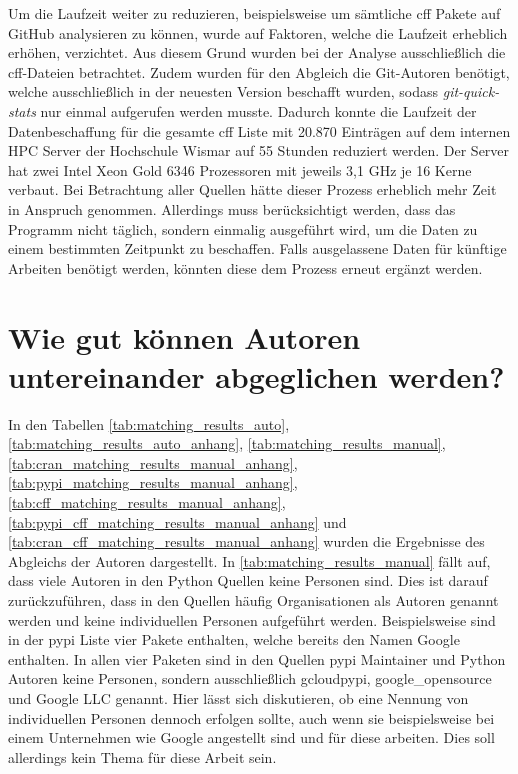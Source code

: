 Um die Laufzeit weiter zu reduzieren, beispielsweise um sämtliche \gls{cff} Pakete auf GitHub analysieren zu können, wurde auf Faktoren, welche die Laufzeit erheblich erhöhen, verzichtet.
Aus diesem Grund wurden bei der Analyse ausschließlich die \gls{cff}-Dateien betrachtet.
Zudem wurden für den Abgleich die Git-Autoren benötigt, welche ausschließlich in der neuesten Version beschafft wurden, sodass \emph{git-quick-stats} nur einmal aufgerufen werden musste.
Dadurch konnte die Laufzeit der Datenbeschaffung für die gesamte \gls{cff} Liste mit 20.870 Einträgen auf dem internen HPC Server der Hochschule Wismar auf 55 Stunden reduziert werden.
Der Server hat zwei Intel Xeon Gold 6346 Prozessoren mit jeweils 3,1 GHz je 16 Kerne verbaut.
Bei Betrachtung aller Quellen hätte dieser Prozess erheblich mehr Zeit in Anspruch genommen.
Allerdings muss berücksichtigt werden, dass das Programm nicht täglich, sondern einmalig ausgeführt wird, um die Daten zu einem bestimmten Zeitpunkt zu beschaffen.
Falls ausgelassene Daten für künftige Arbeiten benötigt werden, könnten diese dem Prozess erneut ergänzt werden.

\section{Wie gut können Autoren untereinander abgeglichen werden?}
\label{sec:abgleich_diskussion}
In den Tabellen \ref{tab:matching_results_auto}, \ref{tab:matching_results_auto_anhang}, \ref{tab:matching_results_manual},\ref{tab:cran_matching_results_manual_anhang}, \ref{tab:pypi_matching_results_manual_anhang}, \ref{tab:cff_matching_results_manual_anhang}, \ref{tab:pypi_cff_matching_results_manual_anhang} und \ref{tab:cran_cff_matching_results_manual_anhang} wurden die Ergebnisse des Abgleichs der Autoren dargestellt.
In \autoref{tab:matching_results_manual} fällt auf, dass viele Autoren in den Python Quellen keine Personen sind.
Dies ist darauf zurückzuführen, dass in den Quellen häufig Organisationen als Autoren genannt werden und keine individuellen Personen aufgeführt werden.
Beispielsweise sind in der \gls{pypi} Liste vier Pakete enthalten, welche bereits den Namen Google enthalten.
In allen vier Paketen sind in den Quellen \gls{pypi} Maintainer und Python Autoren keine Personen, sondern ausschließlich \glqq gcloudpypi\grqq{}, \glqq google\_opensource\grqq{} und \glqq Google LLC\grqq{} genannt.
Hier lässt sich diskutieren, ob eine Nennung von individuellen Personen dennoch erfolgen sollte, auch wenn sie beispielsweise bei einem Unternehmen wie Google angestellt sind und für diese arbeiten.
Dies soll allerdings kein Thema für diese Arbeit sein.

